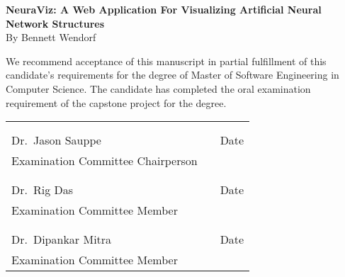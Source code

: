 \thispagestyle{empty}
\vspace*{0.3in}
\begin{center}
	\large{\textbf{NeuraViz: A Web Application For Visualizing Artificial Neural Network Structures}} \\
	\vspace{0.75in}
	\normalsize{By Bennett Wendorf}
\end{center}

\vspace{0.5in}
\noindent We recommend acceptance of this manuscript in partial fulfillment of this candidate's requirements for the degree of Master of Software Engineering in Computer Science. The candidate has completed the oral examination requirement of the capstone project for the degree. \\

\noindent
\begin{tabularx}{\textwidth}{p{3in}Xp{2in}}
	\rule{0pt}{50pt} & & \\
	\hrulefill & & \hrulefill \\
	Dr.\ Jason Sauppe & & Date \\
	Examination Committee Chairperson & & \\
	\rule{0pt}{50pt} & & \\
	\hrulefill & & \hrulefill \\
	Dr.\ Rig Das & & Date \\
	Examination Committee Member & & \\
	\rule{0pt}{50pt} & & \\
	\hrulefill & & \hrulefill \\
	Dr.\ Dipankar Mitra & & Date \\
	Examination Committee Member & & \\
\end{tabularx}

